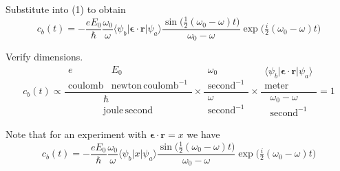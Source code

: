 Substitute into (1) to obtain
\begin{equation*}
c_b(t)=-\frac{eE_0}{\hbar}\frac{\omega_0}{\omega}
\langle\psi_b|\boldsymbol{\epsilon}\cdot\mathbf r|\psi_a\rangle
\frac{\sin\bigl(\tfrac{1}{2}(\omega_0-\omega)t\bigr)}{\omega_0-\omega}
\exp\bigl(\tfrac{i}{2}(\omega_0-\omega)t\bigr)
\end{equation*}

Verify dimensions.
\begin{equation*}
c_b(t)\propto
\frac{\begin{matrix}
e & E_0
\\
\text{coulomb} & \text{newton}\,\text{coulomb}^{-1}
\end{matrix}}
{\begin{matrix}
\hbar
\\
\text{joule}\,\text{second}
\end{matrix}}
\times
\frac{\begin{matrix}
\omega_0
\\
\text{second}^{-1}
\end{matrix}}
{\begin{matrix}
\omega
\\
\text{second}^{-1}
\end{matrix}}
\times
\frac{\begin{matrix}
\langle\psi_b|\boldsymbol{\epsilon}\cdot\mathbf r|\psi_a\rangle
\\
\text{meter}
\end{matrix}}
{\begin{matrix}
\omega_0-\omega
\\
\text{second}^{-1}
\end{matrix}}
=1
\end{equation*}

Note that for an experiment with $\boldsymbol{\epsilon}\cdot\mathbf r=x$ we have
\begin{equation*}
c_b(t)=-\frac{eE_0}{\hbar}\frac{\omega_0}{\omega}
\langle\psi_b|x|\psi_a\rangle
\frac{\sin\bigl(\tfrac{1}{2}(\omega_0-\omega)t\bigr)}{\omega_0-\omega}
\exp\bigl(\tfrac{i}{2}(\omega_0-\omega)t\bigr)
\end{equation*}


